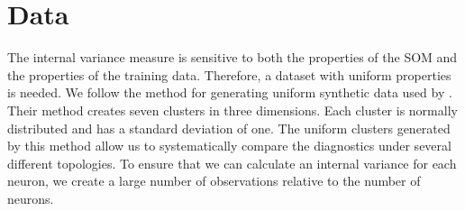 \section{Data}
\label{meth:data}
The internal variance measure is sensitive to both the properties of the SOM
and the properties of the training data. Therefore, a dataset with uniform
properties is needed. We follow the method for generating uniform synthetic
data used by \cite{wu2006}.  
Their method creates seven clusters in three dimensions.
Each cluster is normally distributed and has a standard deviation
of one.  The uniform clusters generated by this method allow us to
systematically compare the diagnostics under several different topologies.  To
ensure that we can calculate an internal variance for each neuron, we create a
large number of observations relative to the number of neurons.








